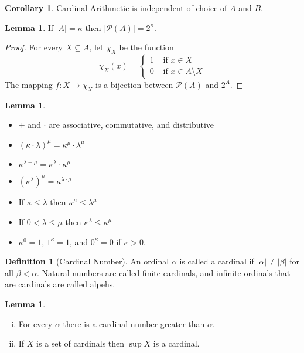 \documentclass{article}
\theoremstyle{definition}
\newtheorem{crly}[thm]{Corollary}
\newtheorem{defn}[thm]{Definition}
\newtheorem{lmma}[thm]{Lemma}
\newcommand{\powset}[1]{\mathcal{P}(#1)}
\newcommand{\abs}[1]{\lvert#1\rvert}
\begin{document}
\begin{crly}
    Cardinal Arithmetic is independent of choice of $A$ and $B$. 
\end{crly}

\begin{lmma}
    If $\abs{A} = \kappa$ then $\abs{\powset{A}} = 2^\kappa$.
\end{lmma}

\begin{proof}
    For every $X \subseteq A$, let $\chi_X$ be the function 
    \[
        \chi_X(x) = 
        \begin{cases*}
            1 & \text{ if $x \in X$}
            \\
            0 & \text{ if $x \in A \setminus X$}
        \end{cases*}    
    \]
    The mapping $f: X \to \chi_X$ is a bijection between $\powset{A}$ and $2^A$.
\end{proof}

\begin{lmma}
    \hfill
    \begin{itemize}
        \item $+$ and $\cdot$ are associative, commutative, and distributive
        \item $(\kappa \cdot \lambda)^\mu = \kappa^\mu \cdot \lambda^\mu$ 
        \item $\kappa^{\lambda + \mu} = \kappa^\lambda \cdot \kappa^\mu$
        \item $(\kappa^\lambda)^\mu = \kappa^{\lambda \cdot \mu}$
        \item If $\kappa \le \lambda$ then $\kappa^\mu \le \lambda^\mu$
        \item If $0 < \lambda \le \mu$ then $\kappa^\lambda \le \kappa^\mu$
        \item $\kappa^0 = 1$, $1^\kappa = 1$, and $0^\kappa = 0$ if $\kappa > 0$.
    \end{itemize}
\end{lmma}

\newpage

\begin{defn}[Cardinal Number]
    An ordinal $\alpha$ is called a cardinal if $\abs{\alpha} \ne \abs{\beta}$ for all $\beta < \alpha$. Natural numbers are called finite cardinals, and infinite ordinals that are cardinals are called alpehs.
\end{defn}

\begin{lmma}
    \hfill
    \begin{enumerate}[(i)]
        \item For every $\alpha$ there is a cardinal number greater than $\alpha$.
        \item If $X$ is a set of cardinals then $\sup X$ is a cardinal.
    \end{enumerate}
\end{lmma}
\end{document}
